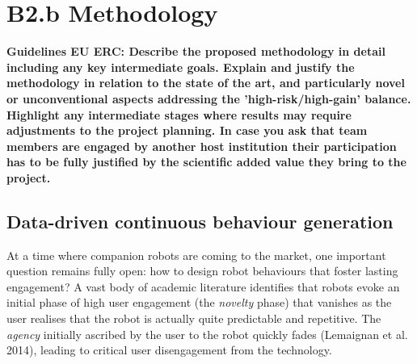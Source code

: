 \documentclass[11pt]{report}
\newcommand{\eu}[1]{{\color{teal}\textbf{Guidelines EU ERC: #1}}}
\begin{document}
\chapter{B2.b Methodology}\label{research-methodology}

\eu{Describe the proposed methodology in detail including any key intermediate
goals. Explain and justify the methodology in relation to the state of the art,
and particularly novel or unconventional aspects addressing the
'high-risk/high-gain' balance. Highlight any intermediate stages where results
may require adjustments to the project planning. In case you ask that team
members are engaged by another host institution their participation has to be
fully justified by the scientific added value they bring to the project.}

\section{Data-driven continuous behaviour generation}


At a time where companion robots are coming to the market, one important
question remains fully open: how to design robot behaviours that foster
lasting engagement? A vast body of academic literature identifies that
robots evoke an initial phase of high user engagement (the
\emph{novelty} phase) that vanishes as the user realises that the robot
is actually quite predictable and repetitive. The \emph{agency}
initially ascribed by the user to the robot quickly fades (Lemaignan et
al. 2014), leading to critical user disengagement from the technology.
\end{document}

